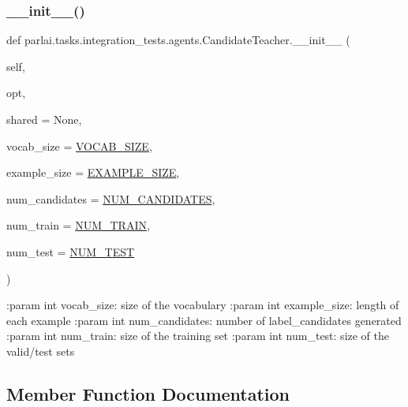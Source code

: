 \subsubsection{\texorpdfstring{\+\_\+\+\_\+init\+\_\+\+\_\+()}{\_\_init\_\_()}}
{\footnotesize\ttfamily def parlai.\+tasks.\+integration\+\_\+tests.\+agents.\+Candidate\+Teacher.\+\_\+\+\_\+init\+\_\+\+\_\+ (\begin{DoxyParamCaption}\item[{}]{self,  }\item[{}]{opt,  }\item[{}]{shared = {\ttfamily None},  }\item[{}]{vocab\+\_\+size = {\ttfamily \hyperlink{namespaceparlai_1_1tasks_1_1integration__tests_1_1agents_acce0481273f02014fb577733cfa8f2b7}{V\+O\+C\+A\+B\+\_\+\+S\+I\+ZE}},  }\item[{}]{example\+\_\+size = {\ttfamily \hyperlink{namespaceparlai_1_1tasks_1_1integration__tests_1_1agents_a1a9a556c90b625c74c9afd0a1a82ca3c}{E\+X\+A\+M\+P\+L\+E\+\_\+\+S\+I\+ZE}},  }\item[{}]{num\+\_\+candidates = {\ttfamily \hyperlink{namespaceparlai_1_1tasks_1_1integration__tests_1_1agents_a43719015a313515dcd768b12491ec3a1}{N\+U\+M\+\_\+\+C\+A\+N\+D\+I\+D\+A\+T\+ES}},  }\item[{}]{num\+\_\+train = {\ttfamily \hyperlink{namespaceparlai_1_1tasks_1_1integration__tests_1_1agents_abc5a5ed634c3ec4aa371a49b883d37a1}{N\+U\+M\+\_\+\+T\+R\+A\+IN}},  }\item[{}]{num\+\_\+test = {\ttfamily \hyperlink{namespaceparlai_1_1tasks_1_1integration__tests_1_1agents_ad6197fa4ad385bde5542da3aa644ad8b}{N\+U\+M\+\_\+\+T\+E\+ST}} }\end{DoxyParamCaption})}

\begin{DoxyVerb}:param int vocab_size: size of the vocabulary
:param int example_size: length of each example
:param int num_candidates: number of label_candidates generated
:param int num_train: size of the training set
:param int num_test: size of the valid/test sets
\end{DoxyVerb}
 

\subsection{Member Function Documentation}
\mbox{\label{classparlai_1_1tasks_1_1integration__tests_1_1agents_1_1CandidateTeacher_a9218a0601a698deefda24fe649b034ce}} 
